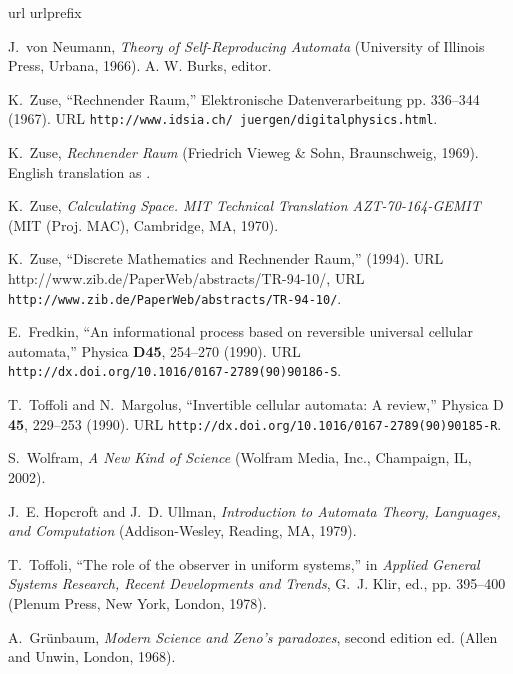 \documentclass[pre,amssymb,showpacs,showkeys,preprint]{revtex4}
\begin{document}
\begin{thebibliography}{10}
\newcommand{\enquote}[1]{``#1''}
\expandafter\ifx\csname url\endcsname\relax
  \def\url#1{\texttt{#1}}\fi
\expandafter\ifx\csname urlprefix\endcsname\relax\def\urlprefix{URL }\fi
\providecommand{\eprint}[2][]{\url{#2}}

J.~von Neumann, \emph{Theory of Self-Reproducing Automata} (University of
  Illinois Press, Urbana, 1966). A. W. Burks, editor.

K.~Zuse, \enquote{{R}echnender {R}aum,} Elektronische Datenverarbeitung pp.
  336--344 (1967).
  \urlprefix\url{http://www.idsia.ch/~juergen/digitalphysics.html}.

K.~Zuse, \emph{{R}echnender {R}aum} (Friedrich Vieweg \& Sohn, Braunschweig,
  1969). {E}nglish translation as \cite{zuse-70}.

K.~Zuse, \emph{Calculating Space. MIT Technical Translation AZT-70-164-GEMIT}
  (MIT (Proj. MAC), Cambridge, MA, 1970).

K.~Zuse, \enquote{Discrete Mathematics and {R}echnender {R}aum,}  (1994). {URL}
  http://www.zib.de/PaperWeb/abstracts/TR-94-10/,
  \urlprefix\url{http://www.zib.de/PaperWeb/abstracts/TR-94-10/}.

E.~Fredkin, \enquote{An informational process based on reversible universal
  cellular automata,} Physica \textbf{D45}, 254--270 (1990).
  \urlprefix\url{http://dx.doi.org/10.1016/0167-2789(90)90186-S}.

T.~Toffoli and N.~Margolus, \enquote{Invertible cellular automata: A review,}
  Physica D \textbf{45}, 229--253 (1990).
  \urlprefix\url{http://dx.doi.org/10.1016/0167-2789(90)90185-R}.

S.~Wolfram, \emph{A New Kind of Science} (Wolfram Media, Inc., Champaign, IL,
  2002).

J.~E. Hopcroft and J.~D. Ullman, \emph{Introduction to Automata Theory,
  Languages, and Computation} (Addison-Wesley, Reading, MA, 1979).

T.~Toffoli, \enquote{The role of the observer in uniform systems,} in
  \emph{Applied General Systems Research, Recent Developments and Trends},
  G.~J. Klir, ed., pp. 395--400 (Plenum Press, New York, London, 1978).

A.~Gr{\"{u}}nbaum, \emph{Modern Science and Zeno's paradoxes}, second edition
  ed. (Allen and Unwin, London, 1968).


\end{thebibliography}
\end{document}
